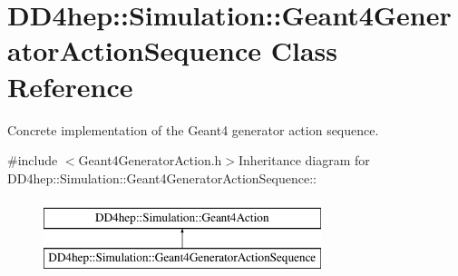 \hypertarget{class_d_d4hep_1_1_simulation_1_1_geant4_generator_action_sequence}{
\section{DD4hep::Simulation::Geant4GeneratorActionSequence Class Reference}
\label{class_d_d4hep_1_1_simulation_1_1_geant4_generator_action_sequence}
}


Concrete implementation of the Geant4 generator action sequence.  


{\ttfamily \#include $<$Geant4GeneratorAction.h$>$}Inheritance diagram for DD4hep::Simulation::Geant4GeneratorActionSequence::\begin{figure}[H]
\begin{center}
\leavevmode
\includegraphics[height=2cm]{class_d_d4hep_1_1_simulation_1_1_geant4_generator_action_sequence}
\end{center}
\end{figure}
